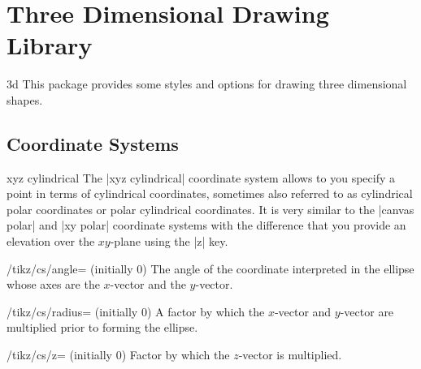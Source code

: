 %
%
%


\section{Three Dimensional Drawing Library}

\begin{tikzlibrary}{3d}
    This package provides some styles and options for drawing three dimensional
    shapes.
\end{tikzlibrary}
%
\begin{codeexample}
    \usetikzlibrary{3d}
\end{codeexample}


\subsection{Coordinate Systems}

\begin{coordinatesystem}{xyz cylindrical}
    The |xyz cylindrical| coordinate system allows to you specify a point in
    terms of cylindrical coordinates, sometimes also referred to as cylindrical
    polar coordinates or polar cylindrical coordinates. It is very similar to
    the |canvas polar| and |xy polar| coordinate systems with the difference
    that you provide an elevation over the $xy$-plane using the |z| key.
    \begin{key}{/tikz/cs/angle= (initially 0)}
        The angle of the coordinate interpreted in the ellipse whose axes are
        the $x$-vector and the $y$-vector.
    \end{key}
    \begin{key}{/tikz/cs/radius= (initially 0)}
        A factor by which the $x$-vector and $y$-vector are multiplied prior to
        forming the ellipse.
    \end{key}
    \begin{key}{/tikz/cs/z= (initially 0)}
        Factor by which the $z$-vector is multiplied.
    \end{key}
\begin{codeexample}[]
\end{codeexample}
\end{coordinatesystem}

